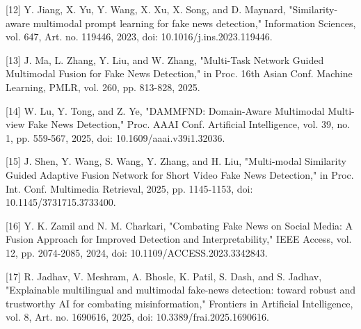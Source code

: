 [12] Y. Jiang, X. Yu, Y. Wang, X. Xu, X. Song, and D. Maynard, "Similarity-aware multimodal prompt learning for fake news detection," Information Sciences, vol. 647, Art. no. 119446, 2023, doi: 10.1016/j.ins.2023.119446.


[13] J. Ma, L. Zhang, Y. Liu, and W. Zhang, "Multi-Task Network Guided Multimodal Fusion for Fake News Detection," in Proc. 16th Asian Conf. Machine Learning, PMLR, vol. 260, pp. 813-828, 2025.


[14] W. Lu, Y. Tong, and Z. Ye, "DAMMFND: Domain-Aware Multimodal Multi-view Fake News Detection," Proc. AAAI Conf. Artificial Intelligence, vol. 39, no. 1, pp. 559-567, 2025, doi: 10.1609/aaai.v39i1.32036.


[15] J. Shen, Y. Wang, S. Wang, Y. Zhang, and H. Liu, "Multi-modal Similarity Guided Adaptive Fusion Network for Short Video Fake News Detection," in Proc. Int. Conf. Multimedia Retrieval, 2025, pp. 1145-1153, doi: 10.1145/3731715.3733400.


[16] Y. K. Zamil and N. M. Charkari, "Combating Fake News on Social Media: A Fusion Approach for Improved Detection and Interpretability," IEEE Access, vol. 12, pp. 2074-2085, 2024, doi: 10.1109/ACCESS.2023.3342843.


[17] R. Jadhav, V. Meshram, A. Bhosle, K. Patil, S. Dash, and S. Jadhav, "Explainable multilingual and multimodal fake-news detection: toward robust and trustworthy AI for combating misinformation," Frontiers in Artificial Intelligence, vol. 8, Art. no. 1690616, 2025, doi: 10.3389/frai.2025.1690616.
